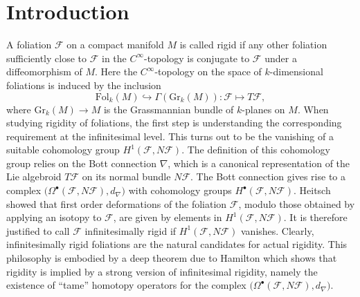 \documentclass[11pt, letterpaper, oneside,reqno]{amsart}
\theoremstyle{plain}
\theoremstyle{underline}
\theoremstyle{definition}
\theoremstyle{remark}
\begin{document}
	\section{Introduction}
	A foliation $\mathcal{F}$ on a compact manifold $M$ is called rigid if any other foliation sufficiently close to $\mathcal{F}$ in the $C^{\infty}$-topology is conjugate to $\mathcal{F}$ under a diffeomorphism of $M$. Here the $C^{\infty}$-topology on the space of $k$-dimensional foliations is induced by the inclusion 
	\[ \mathrm{Fol}_k(M)\hookrightarrow \Gamma(\mathrm{Gr}_k(M)):\mathcal{F}\mapsto T\mathcal{F},\]
	where $\mathrm{Gr}_k(M)\to M$ is the Grassmannian bundle of $k$-planes on $M$. When studying rigidity of foliations, the first step is understanding the corresponding requirement at the infinitesimal level. This turns out to be the vanishing of  a suitable cohomology group $H^{1}(\mathcal{F},N\mathcal{F})$. The definition of this cohomology group relies on the Bott connection $\nabla$, which is a canonical representation of the Lie algebroid $T\mathcal{F}$ on its normal bundle $N\mathcal{F}$. The Bott  connection gives rise to a complex $\big(\Omega^{\bullet}(\mathcal{F},N\mathcal{F}),d_{\nabla}\big)$ with cohomology groups $H^{\bullet}(\mathcal{F},N\mathcal{F})$. Heitsch \cite{Heitsch} showed that first order deformations of the foliation $\mathcal{F}$, modulo those obtained by applying an isotopy to $\mathcal{F}$, are given by elements in $H^{1}(\mathcal{F},N\mathcal{F})$. It is therefore justified to call $\mathcal{F}$ infinitesimally rigid if $H^{1}(\mathcal{F},N\mathcal{F})$ vanishes. Clearly, infinitesimally rigid foliations are the natural candidates for actual rigidity. This philosophy is embodied by a deep theorem due to Hamilton \cite{Hamilton} which shows that rigidity is implied by a strong version of infinitesimal rigidity, namely the existence of ``tame'' homotopy operators for the complex $\big(\Omega^{\bullet}(\mathcal{F},N\mathcal{F}),d_{\nabla}\big)$.
	
	\vspace{0.2cm}
	
\end{document}
